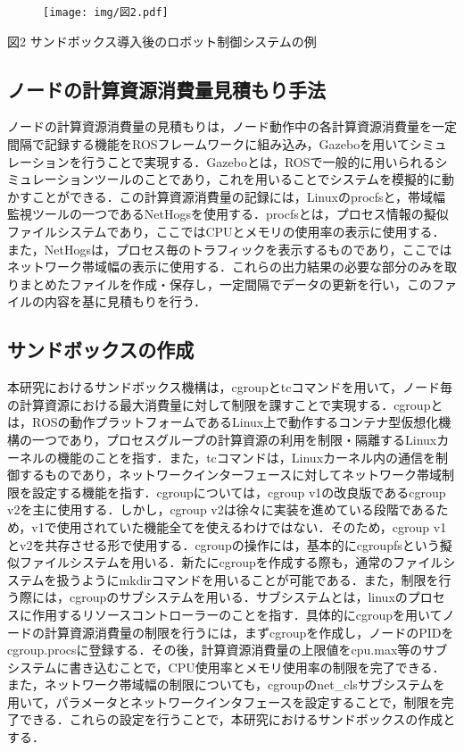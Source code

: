 \documentclass[11pt]{ujarticle} %
\begin{document}
\begin{figure}[h]
   \centering
   \texttt{[image: img/図2.pdf]}
\end{figure}
\begin{center}図2 サンドボックス導入後のロボット制御システムの例\end{center}

\subsection{ノードの計算資源消費量見積もり手法}
ノードの計算資源消費量の見積もりは，ノード動作中の各計算資源消費量を一定間隔で記録する機能をROSフレームワークに組み込み，Gazeboを用いてシミュレーションを行うことで実現する．Gazeboとは，ROSで一般的に用いられるシミュレーションツールのことであり，これを用いることでシステムを模擬的に動かすことができる．この計算資源消費量の記録には，Linuxのprocfsと，帯域幅監視ツールの一つであるNetHogsを使用する．procfsとは，プロセス情報の擬似ファイルシステムであり，ここではCPUとメモリの使用率の表示に使用する．また，NetHogsは，プロセス毎のトラフィックを表示するものであり，ここではネットワーク帯域幅の表示に使用する．これらの出力結果の必要な部分のみを取りまとめたファイルを作成・保存し，一定間隔でデータの更新を行い，このファイルの内容を基に見積もりを行う．
\subsection{サンドボックスの作成}
本研究におけるサンドボックス機構は，cgroupとtcコマンドを用いて，ノード毎の計算資源における最大消費量に対して制限を課すことで実現する．cgroupとは，ROSの動作プラットフォームであるLinux上で動作するコンテナ型仮想化機構の一つであり，プロセスグループの計算資源の利用を制限・隔離するLinuxカーネルの機能のことを指す．また，tcコマンドは，Linuxカーネル内の通信を制御するものであり，ネットワークインターフェースに対してネットワーク帯域制限を設定する機能を指す．cgroupについては，cgroup v1の改良版であるcgroup v2を主に使用する．しかし，cgroup v2は徐々に実装を進めている段階であるため，v1で使用されていた機能全てを使えるわけではない．そのため，cgroup v1とv2を共存させる形で使用する．cgroupの操作には，基本的にcgroupfsという擬似ファイルシステムを用いる．新たにcgroupを作成する際も，通常のファイルシステムを扱うようにmkdirコマンドを用いることが可能である．また，制限を行う際には，cgroupのサブシステムを用いる．サブシステムとは，linuxのプロセスに作用するリソースコントローラーのことを指す．具体的にcgroupを用いてノードの計算資源消費量の制限を行うには，まずcgroupを作成し，ノードのPIDをcgroup.procsに登録する．その後，計算資源消費量の上限値をcpu.max等のサブシステムに書き込むことで，CPU使用率とメモリ使用率の制限を完了できる．また，ネットワーク帯域幅の制限についても，cgroupのnet_clsサブシステムを用いて，パラメータとネットワークインタフェースを設定することで，制限を完了できる．これらの設定を行うことで，本研究におけるサンドボックスの作成とする．
\end{document}
